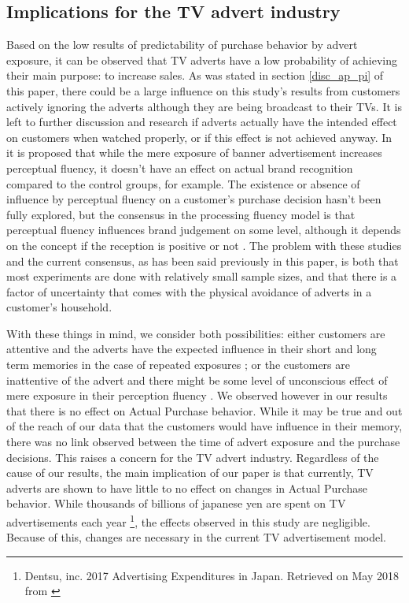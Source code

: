 \documentclass[review]{elsarticle}
\begin{document}
\subsection{Implications for the TV advert industry}
\label{disc_advert}

Based on the low results of predictability of purchase behavior by advert exposure, it can be observed that TV adverts have a low probability of achieving their main purpose: to increase sales. As was stated in section \ref{disc_ap_pi} of this paper, there could be a large influence on this study's results from customers actively ignoring the adverts although they are being broadcast to their TVs. It is left to further discussion and research if adverts actually have the intended effect on customers when watched properly, or if this effect is not achieved anyway. In \cite{fang} it is proposed that while the mere exposure of banner advertisement increases perceptual fluency, it doesn't have an effect on actual brand recognition compared to the control groups, for example. The existence or absence of influence by perceptual fluency on a customer's purchase decision hasn't been fully explored, but the consensus in the processing fluency model is that perceptual fluency influences brand judgement on some level, although it depends on the concept if the reception is positive or not \cite{lee-a}. The problem with these studies and the current consensus, as has been said previously in this paper, is both that most experiments are done with relatively small sample sizes, and that there is a factor of uncertainty that comes with the physical avoidance of adverts in a customer's household.

With these things in mind, we consider both possibilities: either customers are attentive and the adverts have the expected influence in their short and long term memories in the case of repeated exposures \cite{rossiter}; or the customers are inattentive of the advert and there might be some level of unconscious effect of mere exposure in their perception fluency \cite{fang}. We observed however in our results that there is no effect on Actual Purchase behavior. While it may be true and out of the reach of our data that the customers would have influence in their memory, there was no link observed between the time of advert exposure and the purchase decisions. This raises a concern for the TV advert industry. Regardless of the cause of our results, the main implication of our paper is that currently, TV adverts are shown to have little to no effect on changes in Actual Purchase behavior. While thousands of billions of japanese yen are spent on TV advertisements each year \footnote{\label{dentsu}Dentsu, inc. 2017 Advertising Expenditures in Japan. Retrieved on May 2018 from \href {http://www.dentsu.com/knowledgeanddata/ad_expenditures/pdf/expenditures_2017.pdf}{}}, the effects observed in this study are negligible. Because of this, changes are necessary in the current TV advertisement model.
\end{document}
